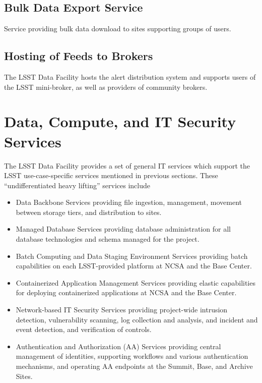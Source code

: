 \subsection{Bulk Data Export Service}
Service providing bulk data download to sites supporting groups of users.


\subsection{Hosting of Feeds to Brokers}
The LSST Data Facility hosts the alert distribution system and supports users of
the LSST mini-broker, as well as providers of community brokers.



\section{Data, Compute, and IT Security Services}
The LSST Data Facility provides a set of general IT services which support the
LSST use-case-specific services mentioned in previous sections. These
``undifferentiated heavy lifting'' services include

\begin{itemize}
\item Data Backbone Services providing file ingestion, management, movement
between storage tiers, and distribution to sites.
\item Managed Database Services providing database administration for all
database technologies and schema managed for the project.
\item Batch Computing and Data Staging Environment Services providing batch
capabilities on each LSST-provided platform at NCSA and the Base Center.
\item Containerized Application Management Services providing elastic
capabilities for deploying containerized applications at NCSA and the Base Center.
\item Network-based IT Security Services providing project-wide intrusion
detection, vulnerability scanning, log collection and analysis, and incident and
event detection, and verification of controls.
\item Authentication and Authorization (AA) Services providing central management of
identities, supporting workflows and various authentication mechanisms, and
operating AA endpoints at the Summit, Base, and Archive Sites.
\end{itemize}

